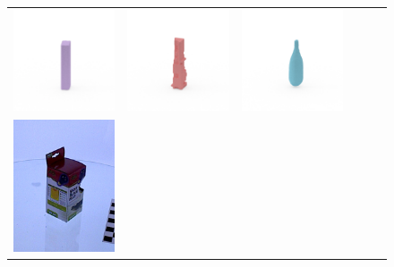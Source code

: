 \documentclass[10pt,twocolumn,letterpaper]{article}
\begin{document}
\begin{figure}
\begin{tabular}{cccccc}
\includegraphics[height=\turnheight, clip=true, trim=60 30 30 60]{data/renders_turn_table/tapatio_hot_sauce_NP1_312.mat_bb_view_90} &
\includegraphics[height=\turnheight, clip=true, trim=60 30 30 60]{data/renders_turn_table/tapatio_hot_sauce_NP1_312.mat_zheng_view_90} &
\includegraphics[height=\turnheight, clip=true, trim=60 30 30 60]{data/renders_turn_table/tapatio_hot_sauce_NP1_312.mat_oma_view_90} \\
\includegraphics[height=\turnheight, clip=true, trim=30 30 30 30]{data/rgb_ims/zilla_night_black_heat} &

\end{tabular}
\end{figure}
\end{document}

